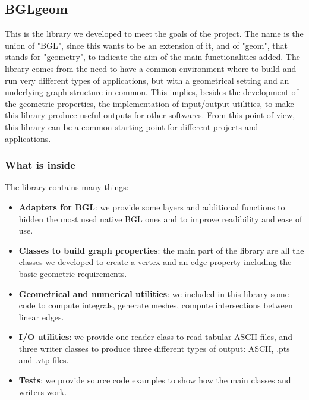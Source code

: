 \documentclass[11pt]{article} %
\begin{document}
	\subsection{BGLgeom}
	This is the library we developed to meet the goals of the project. The name is the union of "BGL", since this wants to be an extension of it, and of "geom", that stands for "geometry", to indicate the aim of the main functionalities added. 
	\newline\newline
	The library comes from the need to have a common environment where to build and run very different types of applications, but with a geometrical setting and an underlying graph structure in common. This implies, besides the development of the geometric properties, the implementation of input/output utilities, to make this library produce useful outputs for other softwares. From this point of view, this library can be a common starting point for different projects and applications.
	\newline\newline	
	
		\subsubsection{What is inside}
		The library contains many things:
		\begin{itemize}
			\item \textbf{Adapters for BGL}: we provide some layers and additional functions to hidden the most used native BGL ones and to improve readibility and ease of use.
			\item \textbf{Classes to build graph properties}: the main part of the library are all the classes we developed to create a vertex and an edge property including the basic geometric requirements.
			\item \textbf{Geometrical and numerical utilities}: we included in this library some code to compute integrals, generate meshes, compute intersections between linear edges.
			\item \textbf{I/O utilities}: we provide one reader class to read tabular ASCII files, and three writer classes to produce three different types of output: ASCII, .pts and .vtp files.
			\item \textbf{Tests}: we provide source code examples to show how the main classes and writers work.
		\end{itemize}
	
\end{document}
